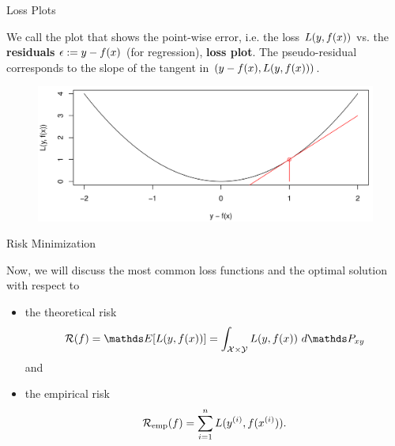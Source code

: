 \begin{vbframe}{Loss Plots}

We call the plot that shows the point-wise error, i.e. the loss $L(y, f(x))$ vs. the \textbf{residuals} $\epsilon := y - f(x)$ (for regression), \textbf{loss plot}. The pseudo-residual corresponds to the slope of the tangent in $\left(y - f(x), L(y, f(x)) \right)$. 

\vspace*{0.5cm}


\begin{figure}
\includegraphics[width = 1\linewidth]{figure_man/loss.png}
\end{figure}



\end{vbframe}




\begin{vbframe}{Risk Minimization}

Now, we will discuss the most common loss functions and the optimal solution with respect to 


\begin{itemize}
  \item the theoretical risk 
  $$
  \riskf =  \E[\Lxy] = \int_{\Xspace \times \Yspace} \Lxy ~ d\Pxy
  $$ 
  and
  \item the empirical risk 
  $$
 \mathcal{R}_{\text{emp}}(f) = \sum_{i=1}^n L(y^{(i)}, f(x^{(i)})). 
  $$
\end{itemize}

\end{vbframe}



